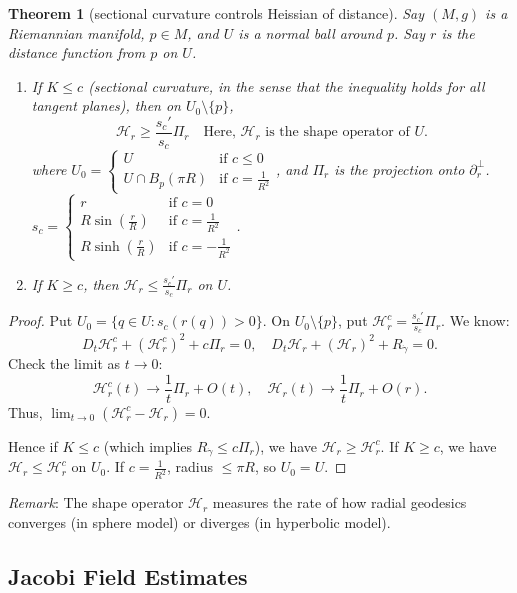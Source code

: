 \documentclass[11pt, a4paper]{article}
\theoremstyle{plain}
\newtheorem{theorem}{Theorem}[section]
\theoremstyle{definition}
\theoremstyle{remark}
\begin{document}
{\begin{theorem}[sectional curvature controls Heissian of distance]
Say $(M,g)$ is a Riemannian manifold, $p \in M$, and $U$ is a normal ball around $p$. Say $r$ is the distance function from $p$ on $U$.
\begin{enumerate}
    \item If $K \le c$ (sectional curvature, in the sense that the inequality holds for all tangent planes), then on $U_0 \setminus \{p\}$, 
    \[ \mathcal{H}_r \ge \frac{s_c'}{s_c} \Pi_r \quad\text{Here, $\mathcal{H}_r$ is the shape operator of $U$.}\]
    where $U_0 = \begin{cases} U & \text{if } c \le 0 \\ U \cap B_p(\pi R) & \text{if } c = \frac{1}{R^2} \end{cases}$, and $\Pi_r$ is the projection onto $\partial_r^\perp$. $s_c = \begin{cases} r & \text{if } c = 0 \\ R \sin(\frac{r}{R}) & \text{if } c = \frac{1}{R^2} \\ R \sinh(\frac{r}{R}) & \text{if } c = -\frac{1}{R^2} \end{cases}$.
    \item If $K \ge c$, then $\mathcal{H}_r \le \frac{s_c'}{s_c} \Pi_r$ on $U$.
\end{enumerate}
\end{theorem}

\begin{proof}
Put $U_0 = \{ q \in U : s_c(r(q)) > 0 \}$. On $U_0 \setminus \{p\}$, put $\mathcal{H}_r^c = \frac{s_c'}{s_c} \Pi_r$. We know:
\[ D_t \mathcal{H}_r^c + (\mathcal{H}_r^c)^2 + c \Pi_r = 0, \quad D_t \mathcal{H}_r + (\mathcal{H}_r)^2 + R_{\dot{\gamma}} = 0. \]
Check the limit as $t \to 0$:
\[ \mathcal{H}_r^c(t) \to \frac{1}{t}\Pi_r + O(t), \quad \mathcal{H}_r(t) \to \frac{1}{t}\Pi_r + O(r). \]
Thus, $\lim_{t \to 0} (\mathcal{H}_r^c - \mathcal{H}_r) = 0$.

Hence if $K \le c$ (which implies $R_{\dot{\gamma}} \le c\Pi_r$), we have $\mathcal{H}_r \ge \mathcal{H}_r^c$. 
If $K \ge c$, we have $\mathcal{H}_r \le \mathcal{H}_r^c$ on $U_0$. 
If $c = \frac{1}{R^2}$, radius $\le \pi R$, so $U_0 = U$.
\end{proof}
\textit{Remark}: The shape operator $\mathcal{H}_r$ measures the rate of how radial geodesics converges (in sphere model) or diverges (in hyperbolic model).



\subsection{Jacobi Field Estimates}

}
\end{document}
